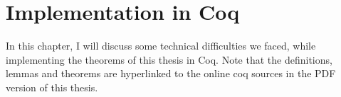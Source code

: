 \chapter{Implementation in Coq}
\label{chap:implementation}

In this chapter, I will discuss some technical difficulties we faced, while implementing the theorems of this thesis in Coq.
Note that the definitions, lemmas and theorems are hyperlinked to the online coq sources in the PDF version of this thesis.


